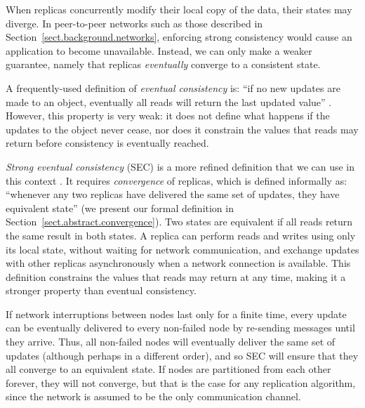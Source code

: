 When replicas concurrently modify their local copy of the data, their states may diverge. In
peer-to-peer networks such as those described in Section~\ref{sect.background.networks}, enforcing
strong consistency would cause an application to become unavailable. Instead, we can only make a
weaker guarantee, namely that replicas \emph{eventually} converge to a consistent state.

A frequently-used definition of \emph{eventual consistency} is: ``if no new updates are made to an
object, eventually all reads will return the last updated value''
\cite{Bailis:2013jc,Burckhardt:2014hy,Terry:1994fp,Vogels:2009ca}. However, this property is very
weak: it does not define what happens if the updates to the object never cease, nor does it
constrain the values that reads may return before consistency is eventually reached.

\emph{Strong eventual consistency} (SEC) is a more refined definition that we can use in this
context \cite{Shapiro:2011un}. It requires \emph{convergence} of replicas, which is defined
informally as: ``whenever any two replicas have delivered the same set of updates, they have
equivalent state'' (we present our formal definition in Section~\ref{sect.abstract.convergence}).
Two states are equivalent if all reads return the same result in both states. A replica can perform
reads and writes using only its local state, without waiting for network communication, and exchange
updates with other replicas asynchronously when a network connection is available. This definition
constrains the values that reads may return at any time, making it a stronger property than eventual
consistency.

If network interruptions between nodes last only for a finite time, every update can be eventually
delivered to every non-failed node by re-sending messages until they arrive. Thus, all non-failed
nodes will eventually deliver the same set of updates (although perhaps in a different order), and
so SEC will ensure that they all converge to an equivalent state. If nodes are partitioned from each
other forever, they will not converge, but that is the case for any replication algorithm, since the
network is assumed to be the only communication channel.

